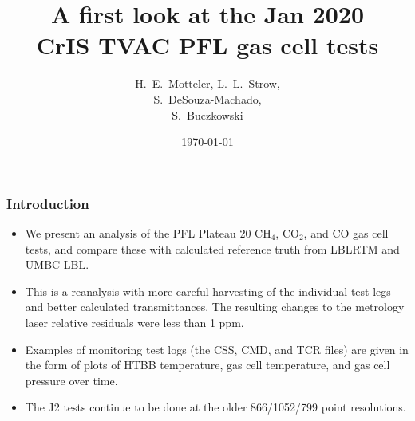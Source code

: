 \documentclass[10pt]{beamer}
\title{A first look at the Jan 2020\\
  CrIS TVAC PFL gas cell tests}
\author{H.~E.~Motteler, L.~L.~Strow, \\
  S.~DeSouza-Machado, \\
  S.~Buczkowski
}
\institute{
  UMBC Atmospheric Spectroscopy Lab \\
  Joint Center for Earth Systems Technology \\
}
\date{\today}
\begin{document}
\begin{frame}[plain]
\titlepage
\end{frame}
\begin{frame}
\frametitle{Introduction}
\begin{itemize}

\item We present an analysis of the PFL Plateau 20 CH$_4$, CO$_2$,
  and CO gas cell tests, and compare these with calculated reference
  truth from LBLRTM and UMBC-LBL.

  \item This is a reanalysis with more careful harvesting of the
    individual test legs and better calculated transmittances.  The
    resulting changes to the metrology laser relative residuals were
    less than 1 ppm.
 
   \item Examples of monitoring test logs (the CSS, CMD, and TCR
     files) are given in the form of plots of HTBB temperature, gas
     cell temperature, and gas cell pressure over time.

  \item The J2 tests continue to be done at the older 866/1052/799
    point resolutions.
    
\end{itemize}
\end{frame}
\end{document}
